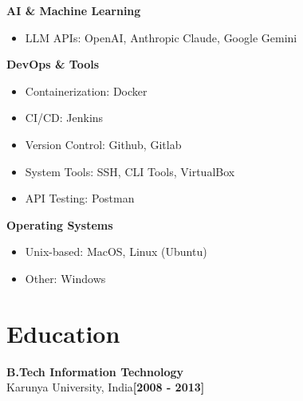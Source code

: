 \documentclass[letterpaper,10pt]{article}
\newcommand{\timelineEntry}[3]{%
	\noindent\color{accent}\large\textbf{#1}\\
	{\color{accent}#2}\hfill\textbf{\color{accent}\small[#3]}
	\newline\newline
}
\begin{document}
\begin{itemize}[leftmargin=*, itemsep=0.1em, label={}]
	\textbf{AI \& Machine Learning}
	\begin{itemize}
		\item LLM APIs: OpenAI, Anthropic Claude, Google Gemini
	\end{itemize}
	
	\textbf{DevOps \& Tools}
	\begin{itemize}
		\item Containerization: Docker
		\item CI/CD: Jenkins
		\item Version Control: Github, Gitlab
		\item System Tools: SSH, CLI Tools, VirtualBox
		\item API Testing: Postman
	\end{itemize}
	
	\textbf{Operating Systems}
	\begin{itemize}
		\item Unix-based: MacOS, Linux (Ubuntu)
		\item Other: Windows
	\end{itemize}
\end{itemize}

\section{Education}
\timelineEntry{B.Tech Information Technology}{Karunya University, India}{2008 - 2013}
\end{document}
